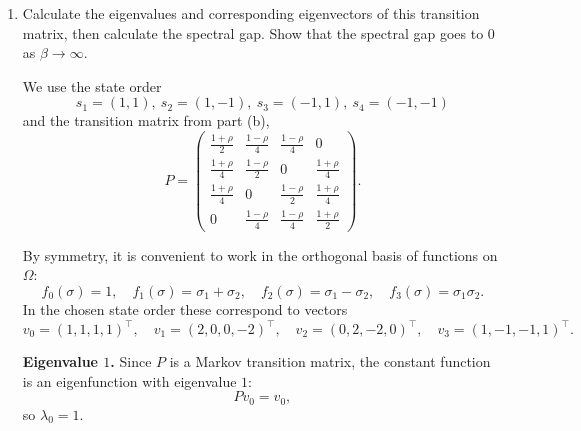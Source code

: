 \documentclass[answers,12pt,addpoints]{exam}
\begin{document}
\begin{enumerate}
\begin{solution}
\medskip
Collecting all rows, the $4\times 4$ transition matrix in the state order
$\{(1,1),(1,-1),(-1,1),(-1,-1)\}$ is
\[
P =
\begin{pmatrix}
\displaystyle \frac{1+\rho}{2} & \displaystyle \frac{1-\rho}{4} & \displaystyle \frac{1-\rho}{4} & 0 \\[6pt]
\displaystyle \frac{1+\rho}{4} & \displaystyle \frac{1-\rho}{2} & 0 & \displaystyle \frac{1+\rho}{4} \\[6pt]
\displaystyle \frac{1+\rho}{4} & 0 & \displaystyle \frac{1-\rho}{2} & \displaystyle \frac{1+\rho}{4} \\[6pt]
0 & \displaystyle \frac{1-\rho}{4} & \displaystyle \frac{1-\rho}{4} & \displaystyle \frac{1+\rho}{2}
\end{pmatrix}.
\]
    \end{solution}
    \item Calculate the eigenvalues and corresponding eigenvectors of this transition matrix, then calculate the spectral gap. Show that the spectral gap goes to $0$ as $\beta \to \infty$.
    \begin{solution}
        We use the state order
\[
s_1 = (1,1),\ s_2 = (1,-1),\ s_3 = (-1,1),\ s_4 = (-1,-1)
\]
and the transition matrix from part (b),
\[
P =
\begin{pmatrix}
\frac{1+\rho}{2} & \frac{1-\rho}{4} & \frac{1-\rho}{4} & 0 \\[4pt]
\frac{1+\rho}{4} & \frac{1-\rho}{2} & 0 & \frac{1+\rho}{4} \\[4pt]
\frac{1+\rho}{4} & 0 & \frac{1-\rho}{2} & \frac{1+\rho}{4} \\[4pt]
0 & \frac{1-\rho}{4} & \frac{1-\rho}{4} & \frac{1+\rho}{2}
\end{pmatrix}.
\]

By symmetry, it is convenient to work in the orthogonal basis of functions
on $\Omega$:
\[
f_0(\sigma) = 1,\quad
f_1(\sigma) = \sigma_1 + \sigma_2,\quad
f_2(\sigma) = \sigma_1 - \sigma_2,\quad
f_3(\sigma) = \sigma_1 \sigma_2.
\]
In the chosen state order these correspond to vectors
\[
v_0 = (1,1,1,1)^\top,\quad
v_1 = (2,0,0,-2)^\top,\quad
v_2 = (0,2,-2,0)^\top,\quad
v_3 = (1,-1,-1,1)^\top.
\]

\medskip
\noindent\textbf{Eigenvalue $1$.}
Since $P$ is a Markov transition matrix, the constant function is an
eigenfunction with eigenvalue $1$:
\[
P v_0 = v_0,
\]
so $\lambda_0 = 1$.


\end{solution}
\end{enumerate}
\end{document}
